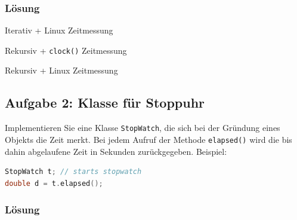 \subsubsection{Lösung}

\large{Iterativ + Linux Zeitmessung}


\large{Rekursiv + \texttt{clock()} Zeitmessung}


\large{Rekursiv + Linux Zeitmessung}


\subsection{Aufgabe 2: Klasse für Stoppuhr}
Implementieren Sie eine Klasse \texttt{StopWatch}, die sich bei der Gründung eines Objekts die Zeit merkt. Bei
jedem Aufruf der Methode \texttt{elapsed()} wird die bis dahin abgelaufene Zeit in Sekunden zurückgegeben.
Beispiel:

\begin{lstlisting}[language=C++, style=C++]
StopWatch t; // starts stopwatch
double d = t.elapsed();
\end{lstlisting}

\subsubsection{Lösung}


\noindent\makebox[\linewidth]{\rule{\paperwidth}{0.4pt}}

\noindent\makebox[\linewidth]{\rule{\paperwidth}{0.4pt}}



